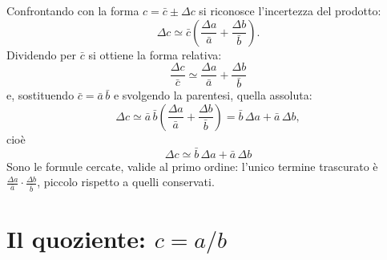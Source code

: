 \documentclass[11pt,a4paper]{article}
\begin{document}
Confrontando con la forma $c = \bar c \pm \Delta c$ si riconosce l'incertezza
del prodotto:
\begin{equation*}
\Delta c \simeq \bar c\left(\frac{\Delta a}{\bar a} + \frac{\Delta b}{\bar b}\right).
\end{equation*}
Dividendo per $\bar c$ si ottiene la forma relativa:
\begin{equation*}
\boxed{\,\frac{\Delta c}{\bar c} \simeq \frac{\Delta a}{\bar a} + \frac{\Delta b}{\bar b}\,}
\end{equation*}
e, sostituendo $\bar c = \bar a\,\bar b$ e svolgendo la parentesi, quella
assoluta:
\begin{equation*}
\Delta c \simeq \bar a\,\bar b\left(\frac{\Delta a}{\bar a} + \frac{\Delta b}{\bar b}\right)
= \bar b\,\Delta a + \bar a\,\Delta b,
\end{equation*}
cioè
\begin{equation*}
\boxed{\,\Delta c \simeq \bar b\,\Delta a + \bar a\,\Delta b\,}
\end{equation*}
Sono le formule cercate, valide al primo ordine: l'unico termine trascurato
è $\frac{\Delta a}{\bar a}\cdot\frac{\Delta b}{\bar b}$, piccolo rispetto a
quelli conservati.

\section*{Il quoziente: $c = a/b$}
\end{document}

